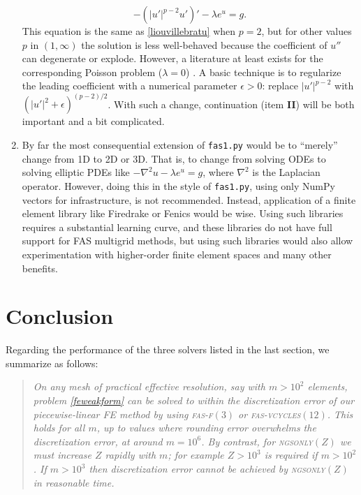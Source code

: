 \documentclass[letterpaper,final,12pt,reqno]{amsart}
\newcommand{\eps}{\epsilon}
\newcommand{\grad}{\nabla}
\begin{document}
\begin{enumerate}
\begin{equation}
  -\left(|u'|^{p-2} u'\right)' - \lambda e^u = g.  \label{pbratu}
\end{equation}
This equation is the same as \eqref{liouvillebratu} when $p=2$, but for other values $p$ in $(1,\infty)$ the solution is less well-behaved because the coefficient of $u''$ can degenerate or explode.  However, a literature at least exists for the corresponding Poisson problem ($\lambda=0$) \cite{BarrettLiu1993,Bueler2021,Evans2007}.  A basic technique is to regularize the leading coefficient with a numerical parameter $\eps>0$: replace $|u'|^{p-2}$ with $\left(|u'|^2+\eps\right)^{(p-2)/2}$.  With such a change, continuation (item \textbf{II}) will be both important and a bit complicated.
\item By far the most consequential extension of \texttt{fas1.py} would be to ``merely'' change from 1D to 2D or 3D.  That is, to change from solving ODEs to solving elliptic PDEs like $-\grad^2 u - \lambda e^u=g$, where $\grad^2$ is the Laplacian operator.  However, doing this in the style of \texttt{fas1.py}, using only NumPy vectors for infrastructure, is not recommended.  Instead, application of a finite element library like Firedrake \cite{Bueler2021,Rathgeberetal2016} or Fenics \cite{Loggetal2012} would be wise.  Using such libraries requires a substantial learning curve, and these libraries do not have full support for FAS multigrid methods, but using such libraries would also allow experimentation with higher-order finite element spaces and many other benefits.
\end{enumerate}


\section{Conclusion}  \label{sec:conclusion}

Regarding the performance of the three solvers listed in the last section, we summarize as follows:

\begin{quotation}
\emph{On any mesh of practical effective resolution, say with $m>10^2$ elements, problem \eqref{feweakform} can be solved to within the discretization error of our piecewise-linear FE method by using \textsc{fas-f}$(3)$ or \textsc{fas-vcycles}$(12)$.  This holds for all $m$, up to values where rounding error overwhelms the discretization error, at around $m=10^6$.  By contrast, for \textsc{ngsonly}$(Z)$ we must increase $Z$ rapidly with $m$; for example $Z > 10^3$ is required if $m>10^2$.  If $m>10^3$ then discretization error cannot be achieved by \textsc{ngsonly}$(Z)$ in reasonable time.}
\end{quotation}
\end{document}
